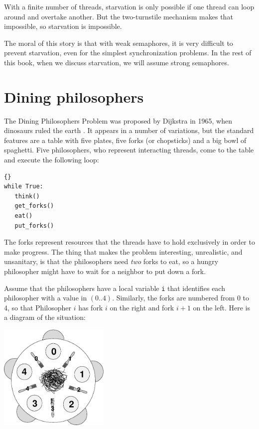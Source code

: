 \documentclass{book}
\newcommand{\clearemptydoublepage}{\newpage\cleardoublepage}
\begin{document}
With a finite number of threads, starvation is only possible if one
thread can loop around and overtake another.  But the two-turnstile
mechanism makes that impossible, so starvation is impossible.

The moral of this story is that with weak semaphores, it is very
difficult to prevent starvation, even for the simplest synchronization
problems.  In the rest of this book, when we discuss starvation, we
will assume strong semaphores.



\clearemptydoublepage
\section{Dining philosophers}
\label{dining}

The Dining Philosophers Problem was proposed by Dijkstra in
1965, when dinosaurs ruled the earth \cite{dijkstra65}.  It
appears in a number of variations, but the standard features
are a table with five plates, five forks (or chopsticks) and
a big bowl of spaghetti.  Five philosophers, who represent
interacting threads, come to the table and execute the
following loop:

\begin{lstlisting}[title={Basic philosopher loop}]{}
while True:
   think()
   get_forks()
   eat()
   put_forks()
\end{lstlisting}

The forks represent resources that the threads have to hold
exclusively in order to make progress.  The thing that makes the
problem interesting, unrealistic, and unsanitary, is that the
philosophers need {\em two} forks to eat, so a hungry philosopher
might have to wait for a neighbor to put down a fork.

Assume that the philosophers have a local variable {\tt i} that
identifies each philosopher with a value in $(0..4)$.  Similarly,
the forks are numbered from 0 to 4, so that Philosopher $i$ has
fork $i$ on the right and fork $i+1$ on
the left.  Here is a diagram of the situation:

\centerline{\includegraphics[height=2in]{table.eps}}
\end{document}
